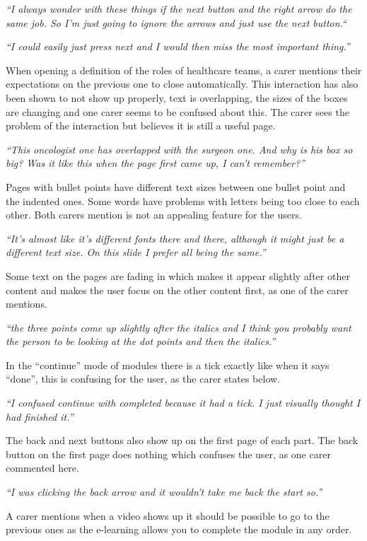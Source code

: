 \documentclass{sigchi}
\begin{document}
\textit{“I always wonder with these things if the next button and the right arrow do the same job. So I’m just going to ignore the arrows and just use the next button.“}

\textit{“I could easily just press next and I would then miss the most important thing.”}

When opening a definition of the roles of healthcare teams, a carer mentions their expectations on the previous one to close automatically. This interaction has also been shown to not show up properly, text is overlapping, the sizes of the boxes are changing and one carer seems to be confused about this. The carer sees the problem of the interaction but believes it is still a useful page.

\textit{“This oncologist one has overlapped with the surgeon one. And why is his box so big? Was it like this when the page first came up, I can’t remember?”}

Pages with bullet points have different text sizes between one bullet point and the indented ones. Some words have problems with letters being too close to each other. Both carers mention is not an appealing feature for the users.

\textit{“It’s almost like it’s different fonts there and there, although it might just be a different text size. On this slide I prefer all being the same.”}

Some text on the pages are fading in which makes it appear slightly after other content and makes the user focus on the other content first, as one of the carer mentions.

\textit{“the three points come up slightly after the italics and I think you probably want the person to be looking at the dot points and then the italics.”}

In the “continue” mode of modules there is a tick exactly like when it says “done”, this is confusing for the user, as the carer states below. 

\textit{“I confused continue with completed because it had a tick. I just visually thought I had finished it.”}

The back and next buttons also show up on the first page of each part. The back button on the first page does nothing which confuses the user, as one carer commented here.

\textit{“I was clicking the back arrow and it wouldn't take me back the start so.”}

A carer mentions when a video shows up it should be possible to go to the previous ones as the e-learning allows you to complete the module in any order.
\end{document}
